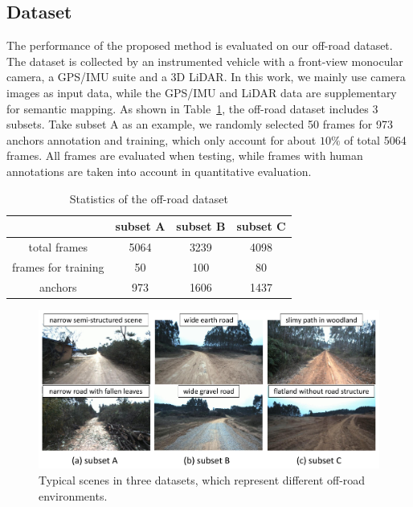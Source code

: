 \documentclass[letterpaper, 10 pt, conference]{ieeeconf}  %
\begin{document}
\subsection{Dataset}
The performance of the proposed method is evaluated on our off-road dataset. The dataset is collected by an instrumented vehicle with a front-view monocular camera, a GPS/IMU suite and a 3D LiDAR. In this work, we mainly use camera images as input data, while the GPS/IMU and LiDAR data are supplementary for semantic mapping.
As shown in Table~\ref{tab:dataset}, the off-road dataset includes 3 subsets. Take subset A as an example, we randomly selected 50 frames for 973 anchors annotation and training, which only account for about $10\%$ of total 5064 frames. All frames are evaluated when testing, while frames with human annotations are taken into account in quantitative evaluation.

\begin{table}[]
	\centering
	\caption{Statistics of the off-road dataset}
	\label{tab:dataset}
	\begin{tabular}{cccc} 
		\hline
		& subset A & subset B & subset C  \\ 
		\hline
		total frames        & 5064     & 3239     & 4098      \\
		frames for training & 50       & 100      & 80        \\
		anchors       & 973      & 1606     & 1437      \\
		\hline
	\end{tabular}
\end{table}

\begin{figure}[]
	\centering
	\includegraphics[scale=0.28]{dataset.pdf}
	\caption{Typical scenes in three datasets, which represent different off-road environments.}
	\label{fig:dataset}
\end{figure}
\end{document}
